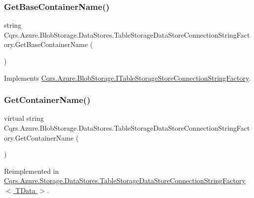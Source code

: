 \subsubsection{\texorpdfstring{Get\+Base\+Container\+Name()}{GetBaseContainerName()}}
{\footnotesize\ttfamily string Cqrs.\+Azure.\+Blob\+Storage.\+Data\+Stores.\+Table\+Storage\+Data\+Store\+Connection\+String\+Factory.\+Get\+Base\+Container\+Name (\begin{DoxyParamCaption}{ }\end{DoxyParamCaption})}



Implements \hyperlink{interfaceCqrs_1_1Azure_1_1BlobStorage_1_1ITableStorageStoreConnectionStringFactory_a1b9bfc9dcb7292e62619fc46e4a85982}{Cqrs.\+Azure.\+Blob\+Storage.\+I\+Table\+Storage\+Store\+Connection\+String\+Factory}.

\mbox{\label{classCqrs_1_1Azure_1_1BlobStorage_1_1DataStores_1_1TableStorageDataStoreConnectionStringFactory_aa1f5d2a17524e6438ad87e60cbaf6f23}} 
\subsubsection{\texorpdfstring{Get\+Container\+Name()}{GetContainerName()}}
{\footnotesize\ttfamily virtual string Cqrs.\+Azure.\+Blob\+Storage.\+Data\+Stores.\+Table\+Storage\+Data\+Store\+Connection\+String\+Factory.\+Get\+Container\+Name (\begin{DoxyParamCaption}{ }\end{DoxyParamCaption})\hspace{0.3cm}{\ttfamily [virtual]}}



Reimplemented in \hyperlink{classCqrs_1_1Azure_1_1Storage_1_1DataStores_1_1TableStorageDataStoreConnectionStringFactory_aa31a217ca659f298016bd8ecabe98387}{Cqrs.\+Azure.\+Storage.\+Data\+Stores.\+Table\+Storage\+Data\+Store\+Connection\+String\+Factory$<$ T\+Data $>$}.

